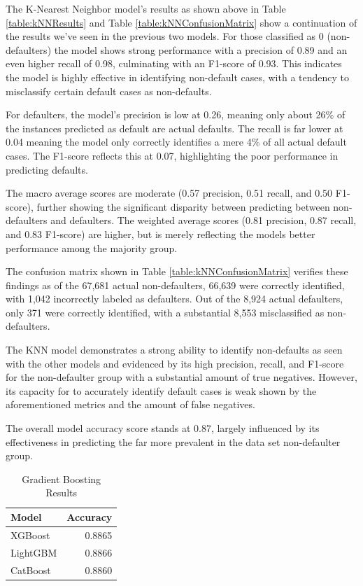 \documentclass[12pt]{article}
\begin{document}
The K-Nearest Neighbor model's results as shown above in Table \ref{table:kNNResults} and Table \ref{table:kNNConfusionMatrix} show a continuation of the results we've seen in the previous two models. For those classified as 0 (non-defaulters) the model shows strong performance with a precision of 0.89 and an even higher recall of 0.98, culminating with an F1-score of 0.93. This indicates the model is highly effective in identifying non-default cases, with a tendency to misclassify certain default cases as non-defaults.

For defaulters, the model's precision is low at 0.26, meaning only about 26\% of the instances predicted as default are actual defaults. The recall is far lower at 0.04 meaning the model only correctly identifies a mere 4\% of all actual default cases. The F1-score reflects this at 0.07, highlighting the poor performance in predicting defaults.

The macro average scores are moderate (0.57 precision, 0.51 recall, and 0.50 F1-score), further showing the significant disparity between predicting between non-defaulters and defaulters. The weighted average scores (0.81 precision, 0.87 recall, and 0.83 F1-score) are higher, but is merely reflecting the models better performance among the majority group.

The confusion matrix shown in Table \ref{table:kNNConfusionMatrix} verifies these findings as of the 67,681 actual non-defaulters, 66,639 were correctly identified, with 1,042 incorrectly labeled as defaulters. Out of the 8,924 actual defaulters, only 371 were correctly identified, with a substantial 8,553 misclassified as non-defaulters. 

The KNN model demonstrates a strong ability to identify non-defaults as seen with the other models and evidenced by its high precision, recall, and F1-score for the non-defaulter group with a substantial amount of true negatives. However, its capacity for to accurately identify default cases is weak shown by the aforementioned metrics and the amount of false negatives.

The overall model accuracy score stands at 0.87, largely influenced by its effectiveness in predicting the far more prevalent in the data set non-defaulter group. 

\begin{table}[htbp]
    \centering
    \caption{Gradient Boosting Results}
    \begin{tabular}{lr}
        \toprule
        Model & Accuracy \\
        \midrule
        XGBoost & 0.8865 \\
        LightGBM & 0.8866 \\
        CatBoost & 0.8860 \\
        \bottomrule
    \end{tabular}
    \label{table:gradientBoostingResults}
\end{table}
\end{document}
